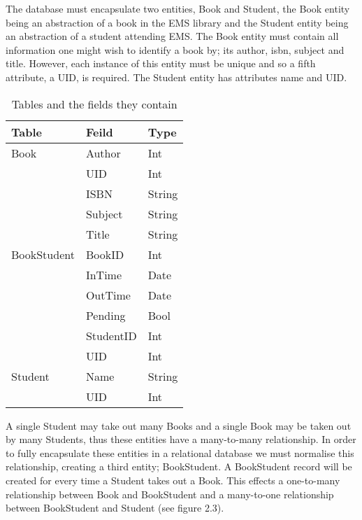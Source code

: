 \documentclass[draft]{book}
\begin{document}
The database must encapsulate two entities, Book and Student, the Book entity
being an abstraction of a book in the EMS library and the Student entity being
an abstraction of a student attending EMS. The Book entity must contain all
information one might wish to identify a book by; its author, isbn, subject
and title. However, each instance of this entity must be unique and so a fifth
attribute, a UID, is required. The Student entity has attributes name and UID.

\begin{table}[t]

    \centering

    \begin{tabu} to 0.7\linewidth {lXX}

        \toprule

        Table       & Feild     & Type   \\

        \midrule

        Book        & Author    & Int    \\
                    & UID       & Int    \\
                    & ISBN      & String \\
                    & Subject   & String \\
                    & Title     & String \\

        BookStudent & BookID    & Int    \\
                    & InTime    & Date   \\
                    & OutTime   & Date   \\
                    & Pending   & Bool   \\
                    & StudentID & Int    \\
                    & UID       & Int    \\

        Student     & Name      & String \\
                    & UID       & Int    \\

        \bottomrule

    \end{tabu}

    \caption[Data Dictionary]{Tables and the fields they contain}

\end{table}

A single Student may take out many Books and a single Book may be taken out by
many Students, thus these entities have a many-to-many relationship. In order
to fully encapsulate these entities in a relational database we must normalise
this relationship, creating a third entity; BookStudent. A BookStudent record
will be created for every time a Student takes out a Book. This effects
a one-to-many relationship between Book and BookStudent and a many-to-one
relationship between BookStudent and Student (see figure 2.3).
\end{document}
